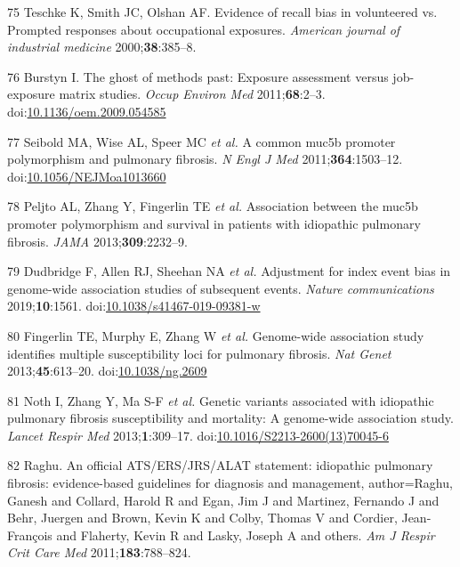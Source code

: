 \documentclass[12pt,a4paper,]{report}
\begin{document}
\leavevmode\hypertarget{ref-Teschke2000}{}%
75 Teschke K, Smith JC, Olshan AF. Evidence of recall bias in
volunteered vs. Prompted responses about occupational exposures.
\emph{American journal of industrial medicine} 2000;\textbf{38}:385--8.

\leavevmode\hypertarget{ref-Burstyn2011}{}%
76 Burstyn I. The ghost of methods past: Exposure assessment versus
job-exposure matrix studies. \emph{Occup Environ Med}
2011;\textbf{68}:2--3.
doi:\href{https://doi.org/10.1136/oem.2009.054585}{10.1136/oem.2009.054585}

\leavevmode\hypertarget{ref-Seibold2011}{}%
77 Seibold MA, Wise AL, Speer MC \emph{et al.} A common muc5b promoter
polymorphism and pulmonary fibrosis. \emph{N Engl J Med}
2011;\textbf{364}:1503--12.
doi:\href{https://doi.org/10.1056/NEJMoa1013660}{10.1056/NEJMoa1013660}

\leavevmode\hypertarget{ref-Peljto2013}{}%
78 Peljto AL, Zhang Y, Fingerlin TE \emph{et al.} Association between
the muc5b promoter polymorphism and survival in patients with idiopathic
pulmonary fibrosis. \emph{JAMA} 2013;\textbf{309}:2232--9.

\leavevmode\hypertarget{ref-Dudbridge2019}{}%
79 Dudbridge F, Allen RJ, Sheehan NA \emph{et al.} Adjustment for index
event bias in genome-wide association studies of subsequent events.
\emph{Nature communications} 2019;\textbf{10}:1561.
doi:\href{https://doi.org/10.1038/s41467-019-09381-w}{10.1038/s41467-019-09381-w}

\leavevmode\hypertarget{ref-Fingerlin2013}{}%
80 Fingerlin TE, Murphy E, Zhang W \emph{et al.} Genome-wide association
study identifies multiple susceptibility loci for pulmonary fibrosis.
\emph{Nat Genet} 2013;\textbf{45}:613--20.
doi:\href{https://doi.org/10.1038/ng.2609}{10.1038/ng.2609}

\leavevmode\hypertarget{ref-Noth2013}{}%
81 Noth I, Zhang Y, Ma S-F \emph{et al.} Genetic variants associated
with idiopathic pulmonary fibrosis susceptibility and mortality: A
genome-wide association study. \emph{Lancet Respir Med}
2013;\textbf{1}:309--17.
doi:\href{https://doi.org/10.1016/S2213-2600(13)70045-6}{10.1016/S2213-2600(13)70045-6}

\leavevmode\hypertarget{ref-Raghu2011}{}%
82 Raghu. An official ATS/ERS/JRS/ALAT statement: idiopathic pulmonary
fibrosis: evidence-based guidelines for diagnosis and management,
author=Raghu, Ganesh and Collard, Harold R and Egan, Jim J and Martinez,
Fernando J and Behr, Juergen and Brown, Kevin K and Colby, Thomas V and
Cordier, Jean-François and Flaherty, Kevin R and Lasky, Joseph A and
others. \emph{Am J Respir Crit Care Med} 2011;\textbf{183}:788--824.
\end{document}
